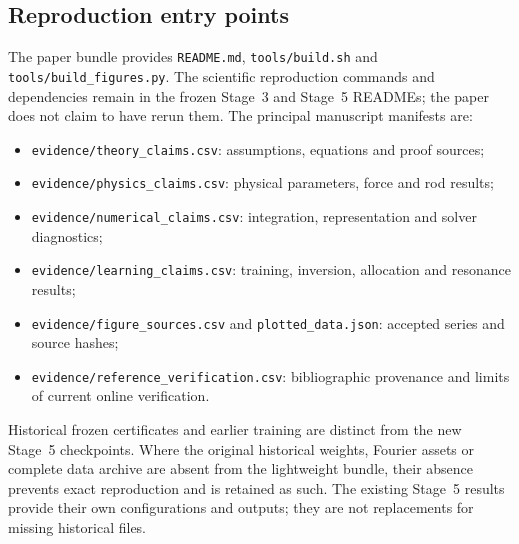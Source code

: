 \subsection{Reproduction entry points}
The paper bundle provides \texttt{README.md}, \texttt{tools/build.sh} and \texttt{tools/build\_figures.py}. The scientific reproduction commands and dependencies remain in the frozen Stage~3 and Stage~5 READMEs; the paper does not claim to have rerun them. The principal manuscript manifests are:
\begin{itemize}
\item \texttt{evidence/theory\_claims.csv}: assumptions, equations and proof sources;
\item \texttt{evidence/physics\_claims.csv}: physical parameters, force and rod results;
\item \texttt{evidence/numerical\_claims.csv}: integration, representation and solver diagnostics;
\item \texttt{evidence/learning\_claims.csv}: training, inversion, allocation and resonance results;
\item \texttt{evidence/figure\_sources.csv} and \texttt{plotted\_data.json}: accepted series and source hashes;
\item \texttt{evidence/reference\_verification.csv}: bibliographic provenance and limits of current online verification.
\end{itemize}

Historical frozen certificates and earlier training are distinct from the new Stage~5 checkpoints. Where the original historical weights, Fourier assets or complete data archive are absent from the lightweight bundle, their absence prevents exact reproduction and is retained as such. The existing Stage~5 results provide their own configurations and outputs; they are not replacements for missing historical files.

